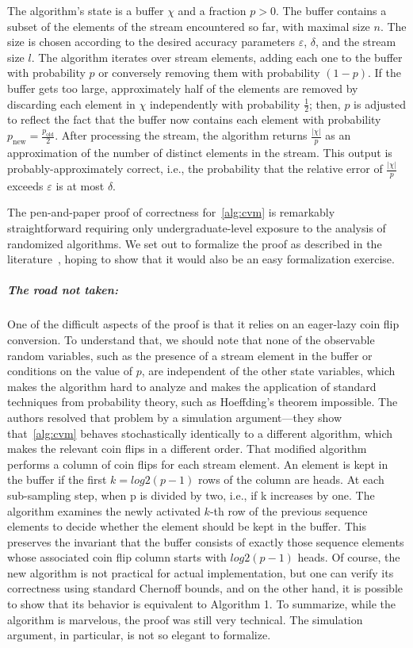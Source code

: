 The algorithm's state is a buffer $\chi$ and a fraction $p > 0$.
The buffer contains a subset of the elements of the stream encountered so far, with maximal size $n$.
The size is chosen according to the desired accuracy parameters $\varepsilon$, $\delta$, and the stream size $l$.
The algorithm iterates over stream elements, adding each one to the buffer with probability $p$ or conversely removing them with probability $(1-p)$.
If the buffer gets too large, approximately half of the elements are removed by discarding each element in $\chi$ independently with probability $\frac{1}{2}$; then, $p$ is adjusted to reflect the fact that the buffer now contains each element with probability $p_\text{new} = \frac{p_\text{old}}{2}$.
After processing the stream, the algorithm returns $\frac{|\chi|}{p}$ as an approximation of the number of distinct elements in the stream.
This output is probably-approximately correct, i.e., the probability that the relative error of $\frac{|\chi|}{p}$ exceeds $\varepsilon$ is at most $\delta$.

The pen-and-paper proof of correctness for~\cref{alg:cvm} is remarkably straightforward requiring only undergraduate-level exposure to the analysis of randomized algorithms.
We set out to formalize the proof as described in the literature~\cite{DBLP:conf/esa/0001VM22}, hoping to show that it would also be an easy formalization exercise.

\subparagraph*{The road not taken:}
One of the difficult aspects of the proof is that it relies on an eager-lazy coin flip conversion.
To understand that, we should note that none of the observable random variables, such as the presence of a stream element in the buffer or conditions on the value of $p$, are independent of the other state variables, which makes the algorithm hard to analyze and makes the application of standard techniques from probability theory, such as Hoeffding's theorem impossible.
The authors resolved that problem by a simulation argument---they show that~\cref{alg:cvm} behaves stochastically identically to a different algorithm, which makes the relevant coin flips in a different order.
That modified algorithm performs a column of coin flips for each stream element.
An element is kept in the buffer if the first $k=log2(p-1)$ rows of the column are heads.
At each sub-sampling step, when p is divided by two, i.e., if k increases by one.
The algorithm examines the newly activated $k$-th row of the previous sequence elements to decide whether the element should be kept in the buffer.
This preserves the invariant that the buffer consists of exactly those sequence elements whose associated coin flip column starts with $log2(p-1)$ heads.
Of course, the new algorithm is not practical for actual implementation, but one can verify its correctness using standard Chernoff bounds, and on the other hand, it is possible to show that its behavior is equivalent to Algorithm 1.
To summarize, while the algorithm is marvelous, the proof was still very technical.
The simulation argument, in particular, is not so elegant to formalize.

